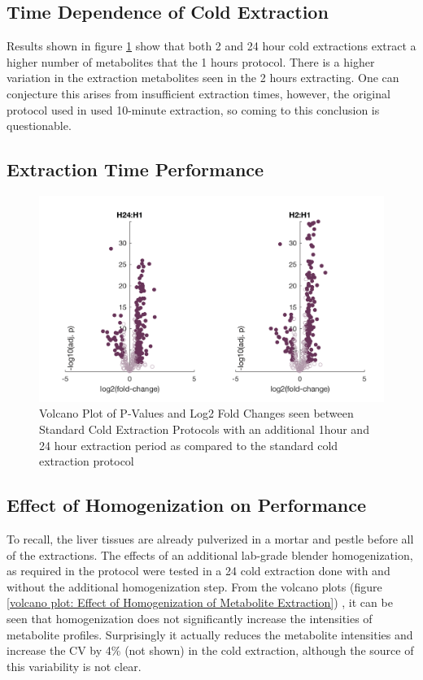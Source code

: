 \documentclass[a4paper,11pt,twoside]{book}
\begin{document}
	\subsection*{Time Dependence of Cold Extraction}
	Results shown in figure \ref{volcano plot: 24h, 1h and 2h cold extraction comparisons} show that both 2 and 24 hour cold extractions extract a higher number of metabolites that the 1 hours protocol. There is a higher variation in the extraction metabolites seen in the 2 hours extracting. One can conjecture this arises from insufficient extraction times, however, the original protocol used in \citep{Williams2016SystemsFunction} used 10-minute extraction, so coming to this conclusion is questionable. 
	
	\subsection*{Extraction Time Performance}
	\begin{figure}[htb]
		\centering
		\includegraphics[width=\linewidth]{2.Optimizaiton_Figures/H1-H24-H2-01}
		\caption{Volcano Plot of P-Values and Log2 Fold Changes seen between Standard Cold Extraction Protocols with an additional 1hour and 24 hour extraction period as compared to the standard cold extraction protocol}
		\label{volcano plot: 24h, 1h and 2h cold extraction comparisons}
	\end{figure}
	
	\subsection*{Effect of Homogenization on Performance}
	
	To recall, the liver tissues are already pulverized in a mortar and pestle before all of the extractions. The effects of an additional lab-grade blender homogenization, as required in the \citeauthor{Williams2016SystemsFunction} protocol were tested in a 24 cold extraction done with and without the additional homogenization step. From the volcano plots (figure \ref{volcano plot: Effect of Homogenization of Metabolite Extraction}) , it can be seen that homogenization does not significantly increase the intensities of metabolite profiles. Surprisingly it actually reduces the metabolite intensities and increase the CV by 4\% (not shown) in the cold extraction, although the source of this variability is not clear.
	
\end{document}
